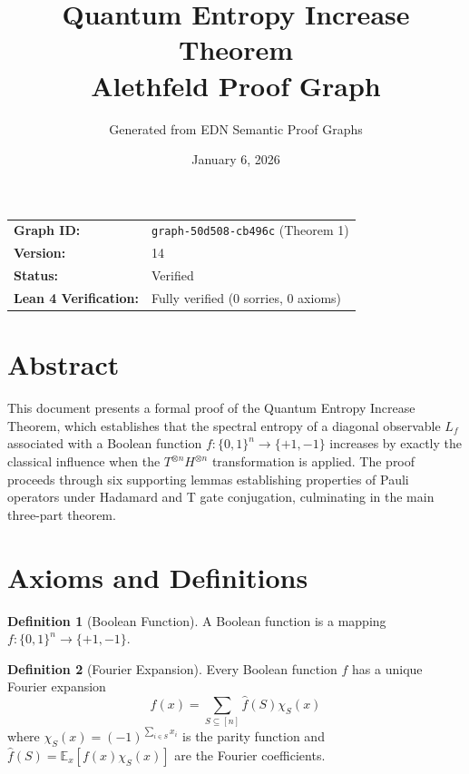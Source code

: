 \documentclass[11pt,a4paper]{article}
\title{\textbf{Quantum Entropy Increase Theorem}\\[0.3em]
{\normalsize Alethfeld Proof Graph}}
\author{Generated from EDN Semantic Proof Graphs}
\date{January 6, 2026}
\theoremstyle{definition}
\newtheorem{definition}{Definition}[section]
\theoremstyle{plain}
\begin{document}
\maketitle

\begin{center}
\begin{tabular}{ll}
\textbf{Graph ID:} & \texttt{graph-50d508-cb496c} (Theorem 1) \\
\textbf{Version:} & 14 \\
\textbf{Status:} & Verified \\
\textbf{Lean 4 Verification:} & Fully verified (0 sorries, 0 axioms) \\
\end{tabular}
\end{center}

\section*{Abstract}

This document presents a formal proof of the Quantum Entropy Increase Theorem, which establishes that the spectral entropy of a diagonal observable $L_f$ associated with a Boolean function $f: \{0,1\}^n \to \{+1,-1\}$ increases by exactly the classical influence when the $T^{\otimes n} H^{\otimes n}$ transformation is applied. The proof proceeds through six supporting lemmas establishing properties of Pauli operators under Hadamard and T gate conjugation, culminating in the main three-part theorem.

\section{Axioms and Definitions}

\begin{definition}[Boolean Function]
A Boolean function is a mapping $f: \{0,1\}^n \to \{+1,-1\}$.
\end{definition}

\begin{definition}[Fourier Expansion]
Every Boolean function $f$ has a unique Fourier expansion
\[
f(x) = \sum_{S \subseteq [n]} \hat{f}(S) \chi_S(x)
\]
where $\chi_S(x) = (-1)^{\sum_{i \in S} x_i}$ is the parity function and $\hat{f}(S) = \mathbb{E}_x[f(x)\chi_S(x)]$ are the Fourier coefficients.
\end{definition}
\end{document}
